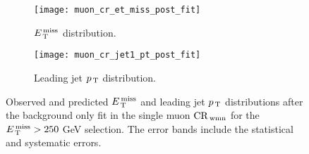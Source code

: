 \begin{figure}[!htb]
  \centering
  \begin{subfigure}[t]{.48\linewidth}
    \texttt{[image: muon\_cr\_et\_miss\_post\_fit]}
    \caption{$E_\mathrm{\, T}^\mathrm{\, miss}$ distribution.}
    \label{fig:muon_cr_et_miss_pre_fit}
  \end{subfigure}
  \begin{subfigure}[t]{.48\linewidth}
    \texttt{[image: muon\_cr\_jet1\_pt\_post\_fit]}
    \caption{Leading jet $p_\mathrm{\, T}$ distribution.}
    \label{fig:muon_cr_jet1_pt_pre_fit}
  \end{subfigure}
  \caption{Observed and predicted $E_\mathrm{\, T}^\mathrm{\, miss}$ and leading jet $p_\mathrm{\, T}$ distributions
    after the background only fit in the single muon $\mathrm{CR}_\mathrm{\, wmn}$ for the
    $E_\mathrm{\, T}^\mathrm{\, miss} > 250~$GeV selection. The error bands include the statistical and
    systematic errors.}
  \label{fig:muon_cr_plots}
\end{figure}
